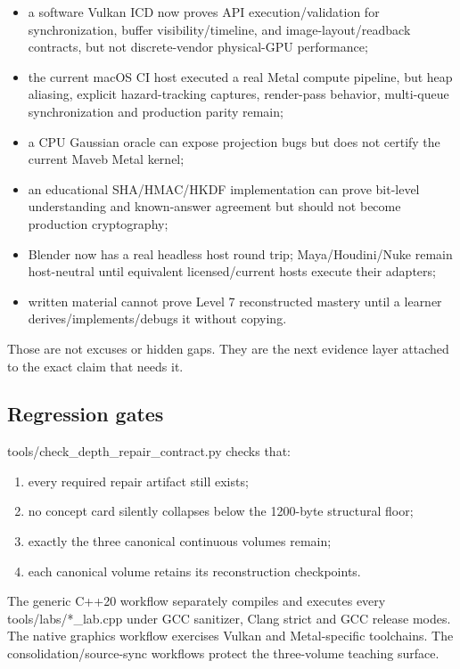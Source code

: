\begin{itemize}
\tightlist
\item
  a software Vulkan ICD now proves API execution/validation for synchronization, buffer visibility/timeline, and image-layout/readback contracts, but not discrete-vendor physical-GPU performance;
\item
  the current macOS CI host executed a real Metal compute pipeline, but heap aliasing, explicit hazard-tracking captures, render-pass behavior, multi-queue synchronization and production parity remain;
\item
  a CPU Gaussian oracle can expose projection bugs but does not certify the current Maveb Metal kernel;
\item
  an educational SHA/HMAC/HKDF implementation can prove bit-level understanding and known-answer agreement but should not become production cryptography;
\item
  Blender now has a real headless host round trip; Maya/Houdini/Nuke remain host-neutral until equivalent licensed/current hosts execute their adapters;
\item
  written material cannot prove Level 7 reconstructed mastery until a learner derives/implements/debugs it without copying.
\end{itemize}

Those are not excuses or hidden gaps. They are the next evidence layer attached to the exact claim that needs it.

\subsection{Regression gates}\label{appendix-2358b21a702d-regression-gates}

tools/check\_depth\_repair\_contract.py checks that:

\begin{enumerate}
\def\labelenumi{\arabic{enumi}.}
\tightlist
\item
  every required repair artifact still exists;
\item
  no concept card silently collapses below the 1200-byte structural floor;
\item
  exactly the three canonical continuous volumes remain;
\item
  each canonical volume retains its reconstruction checkpoints.
\end{enumerate}

The generic C++20 workflow separately compiles and executes every tools/labs/*\_lab.cpp under GCC sanitizer, Clang strict and GCC release modes. The native graphics workflow exercises Vulkan and Metal-specific toolchains. The consolidation/source-sync workflows protect the three-volume teaching surface.

